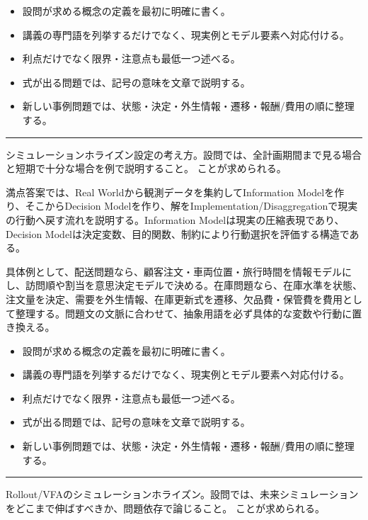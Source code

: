 \begin{itemize}
\item 設問が求める概念の定義を最初に明確に書く。
\item 講義の専門語を列挙するだけでなく、現実例とモデル要素へ対応付ける。
\item 利点だけでなく限界・注意点も最低一つ述べる。
\item 式が出る問題では、記号の意味を文章で説明する。
\item 新しい事例問題では、状態・決定・外生情報・遷移・報酬/費用の順に整理する。
\end{itemize}
\vspace{2mm}\hrule\vspace{2mm}
シミュレーションホライズン設定の考え方。設問では、全計画期間まで見る場合と短期で十分な場合を例で説明すること。 ことが求められる。\par
{}
満点答案では、Real Worldから観測データを集約してInformation Modelを作り、そこからDecision Modelを作り、解をImplementation/Disaggregationで現実の行動へ戻す流れを説明する。Information Modelは現実の圧縮表現であり、Decision Modelは決定変数、目的関数、制約により行動選択を評価する構造である。\par
{}
具体例として、配送問題なら、顧客注文・車両位置・旅行時間を情報モデルにし、訪問順や割当を意思決定モデルで決める。在庫問題なら、在庫水準を状態、注文量を決定、需要を外生情報、在庫更新式を遷移、欠品費・保管費を費用として整理する。問題文の文脈に合わせて、抽象用語を必ず具体的な変数や行動に置き換える。\par
{}
\begin{itemize}
\item 設問が求める概念の定義を最初に明確に書く。
\item 講義の専門語を列挙するだけでなく、現実例とモデル要素へ対応付ける。
\item 利点だけでなく限界・注意点も最低一つ述べる。
\item 式が出る問題では、記号の意味を文章で説明する。
\item 新しい事例問題では、状態・決定・外生情報・遷移・報酬/費用の順に整理する。
\end{itemize}
\vspace{2mm}\hrule\vspace{2mm}
Rollout/VFAのシミュレーションホライズン。設問では、未来シミュレーションをどこまで伸ばすべきか、問題依存で論じること。 ことが求められる。\par
